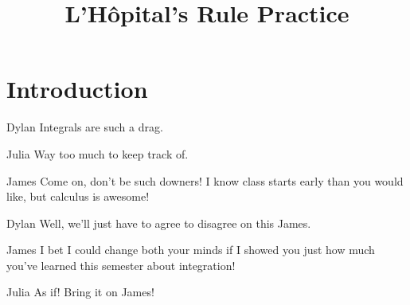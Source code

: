 \documentclass{ximera}
\title{L'H\^{o}pital's Rule Practice}
\theoremstyle{definition}
\begin{document}
\section{Introduction}

\begin{dialogue}
\item[Dylan] Integrals are such a drag.
\item[Julia] Way too much to keep track of.
\item[James] Come on, don't be such downers! I know class starts early than you would like, but calculus is awesome!
\item[Dylan] Well, we'll just have to agree to disagree on this James.
\item[James] I bet I could change both your minds if I showed you just how much you've learned this semester about integration!
\item[Julia] As if! Bring it on James!
\end{dialogue}
\end{document}
